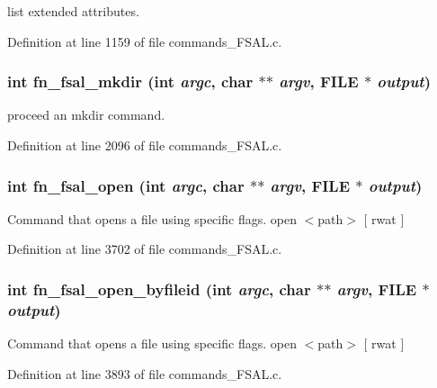 list extended attributes. 

Definition at line 1159 of file commands\_\-FSAL.c.
\subsubsection[{fn\_\-fsal\_\-mkdir}]{\setlength{\rightskip}{0pt plus 5cm}int fn\_\-fsal\_\-mkdir (int {\em argc}, \/  char $\ast$$\ast$ {\em argv}, \/  FILE $\ast$ {\em output})}\label{commands__FSAL_8c_fba8a873b1230bb40c5b57b56f30e600}


proceed an mkdir command. 

Definition at line 2096 of file commands\_\-FSAL.c.
\subsubsection[{fn\_\-fsal\_\-open}]{\setlength{\rightskip}{0pt plus 5cm}int fn\_\-fsal\_\-open (int {\em argc}, \/  char $\ast$$\ast$ {\em argv}, \/  FILE $\ast$ {\em output})}\label{commands__FSAL_8c_7eb0d8c88e206ec8f0a2c3bc7b8586b5}


Command that opens a file using specific flags. open $<$path$>$ [ rwat ] 

Definition at line 3702 of file commands\_\-FSAL.c.
\subsubsection[{fn\_\-fsal\_\-open\_\-byfileid}]{\setlength{\rightskip}{0pt plus 5cm}int fn\_\-fsal\_\-open\_\-byfileid (int {\em argc}, \/  char $\ast$$\ast$ {\em argv}, \/  FILE $\ast$ {\em output})}\label{commands__FSAL_8c_2d40d85e39ad21317aee36aa87be48d0}


Command that opens a file using specific flags. open $<$path$>$ [ rwat ] 

Definition at line 3893 of file commands\_\-FSAL.c.
